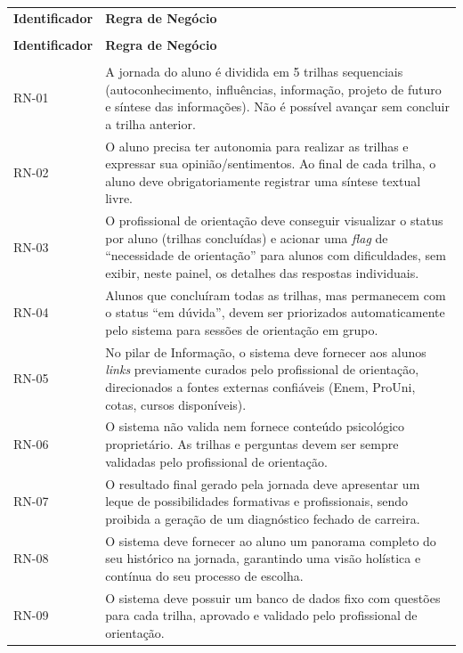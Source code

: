 {\ABNTEXfontereduzida
\renewcommand{\arraystretch}{1.3}
\begin{xltabular}{\textwidth}{|>{\centering\arraybackslash}p{2.6cm}|>{\raggedright\arraybackslash}X|}
 \\[0.3em]
\hline
\textbf{Identificador} & \textbf{Regra de Negócio} \\
\hline
\endfirsthead
{} \\
\hline
\textbf{Identificador} & \textbf{Regra de Negócio} \\
\hline
\endhead
{} \\
\endfoot
\endlastfoot
RN-01 & A jornada do aluno é dividida em 5 trilhas sequenciais (autoconhecimento, influências, informação, projeto de futuro e síntese das informações). Não é possível avançar sem concluir a trilha anterior. \\
\hline
RN-02 & O aluno precisa ter autonomia para realizar as trilhas e expressar sua opinião/sentimentos. Ao final de cada trilha, o aluno deve obrigatoriamente registrar uma síntese textual livre. \\
\hline
RN-03 & O profissional de orientação deve conseguir visualizar o status por aluno (trilhas concluídas) e acionar uma \textit{flag} de ``necessidade de orientação'' para alunos com dificuldades, sem exibir, neste painel, os detalhes das respostas individuais. \\
\hline
RN-04 & Alunos que concluíram todas as trilhas, mas permanecem com o status ``em dúvida'', devem ser priorizados automaticamente pelo sistema para sessões de orientação em grupo. \\
\hline
RN-05 & No pilar de Informação, o sistema deve fornecer aos alunos \textit{links} previamente curados pelo profissional de orientação, direcionados a fontes externas confiáveis (Enem, ProUni, cotas, cursos disponíveis). \\
\hline
RN-06 & O sistema não valida nem fornece conteúdo psicológico proprietário. As trilhas e perguntas devem ser sempre validadas pelo profissional de orientação. \\
\hline
RN-07 & O resultado final gerado pela jornada deve apresentar um leque de possibilidades formativas e profissionais, sendo proibida a geração de um diagnóstico fechado de carreira. \\
\hline
RN-08 & O sistema deve fornecer ao aluno um panorama completo do seu histórico na jornada, garantindo uma visão holística e contínua do seu processo de escolha. \\
\hline
RN-09 & O sistema deve possuir um banco de dados fixo com questões para cada trilha, aprovado e validado pelo profissional de orientação. \\
\hline
\end{xltabular}
}

